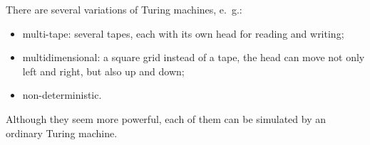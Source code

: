 

\setcounter{section}{8}
\setcounter{subsection}{2}
\setcounter{dfn}{4}

There are several variations of Turing machines, e.~g.:
\begin{itemize}
\item
multi-tape: several tapes, each with its own head for reading and writing;
\item
multidimensional: a square grid instead of a tape, the head can move not only left and right, but also up and down;
\item
non-deterministic.
\end{itemize}
Although they seem more powerful, each of them can be simulated by an ordinary Turing machine.





